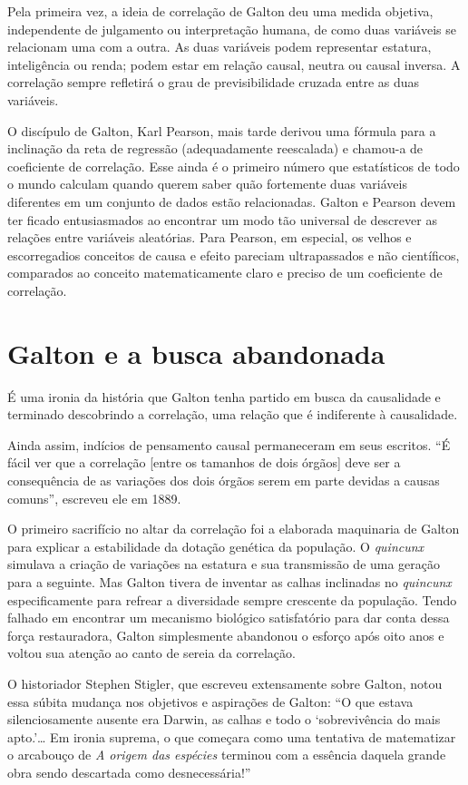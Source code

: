 \documentclass[11pt,a5paper,twoside]{book}
\begin{document}
Pela primeira vez, a ideia de correlação de Galton deu uma medida objetiva, independente de julgamento ou interpretação humana, de como duas variáveis se relacionam uma com a outra. As duas variáveis podem representar estatura, inteligência ou renda; podem estar em relação causal, neutra ou causal inversa. A correlação sempre refletirá o grau de previsibilidade cruzada entre as duas variáveis.

O discípulo de Galton, Karl Pearson, mais tarde derivou uma fórmula para a inclinação da reta de regressão (adequadamente reescalada) e chamou-a de coeficiente de correlação. Esse ainda é o primeiro número que estatísticos de todo o mundo calculam quando querem saber quão fortemente duas variáveis diferentes em um conjunto de dados estão relacionadas. Galton e Pearson devem ter ficado entusiasmados ao encontrar um modo tão universal de descrever as relações entre variáveis aleatórias. Para Pearson, em especial, os velhos e escorregadios conceitos de causa e efeito pareciam ultrapassados e não científicos, comparados ao conceito matematicamente claro e preciso de um coeficiente de correlação.

\section{Galton e a busca abandonada}
É uma ironia da história que Galton tenha partido em busca da causalidade e terminado descobrindo a correlação, uma relação que é indiferente à causalidade.

Ainda assim, indícios de pensamento causal permaneceram em seus escritos. “É fácil ver que a correlação [entre os tamanhos de dois órgãos] deve ser a consequência de as variações dos dois órgãos serem em parte devidas a causas comuns”, escreveu ele em 1889.

O primeiro sacrifício no altar da correlação foi a elaborada maquinaria de Galton para explicar a estabilidade da dotação genética da população. O \textit{quincunx} simulava a criação de variações na estatura e sua transmissão de uma geração para a seguinte. Mas Galton tivera de inventar as calhas inclinadas no \textit{quincunx} especificamente para refrear a diversidade sempre crescente da população. Tendo falhado em encontrar um mecanismo biológico satisfatório para dar conta dessa força restauradora, Galton simplesmente abandonou o esforço após oito anos e voltou sua atenção ao canto de sereia da correlação.

O historiador Stephen Stigler, que escreveu extensamente sobre Galton, notou essa súbita mudança nos objetivos e aspirações de Galton: “O que estava silenciosamente ausente era Darwin, as calhas e todo o ‘sobrevivência do mais apto.’… Em ironia suprema, o que começara como uma tentativa de matematizar o arcabouço de \textit{A origem das espécies} terminou com a essência daquela grande obra sendo descartada como desnecessária!”
\end{document}
